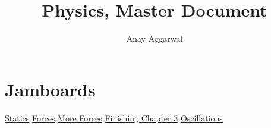 \documentclass[11pt]{scrartcl}
\title{Physics, Master Document}
\author{Anay Aggarwal}
\begin{document}
\maketitle
\section{Jamboards}
\href{https://jamboard.google.com/d/1uoYdMKXinEdf1\_fIV\_Um4zPiH8XeXSZzDs1etD-xgbI/viewer?f=0}{Statics} \newline
\href{https://jamboard.google.com/d/1ajkcgySLsFFmAIlD7kHRhOTfPmT233VM9uvkb6ygHFg/viewer?f=0}{Forces} \newline
\href{https://jamboard.google.com/d/19tQ1\_l9Pz5J62Dyj3KkGLjumSymWhyoXW8kS4kQQBSg/viewer?f=0}{More Forces} \newline
\href{https://jamboard.google.com/d/1MbDdIBIItbUHffvw165ii3ZKFlsYYW7sVqZbw3JTE5k/viewer?f=0}{Finishing Chapter 3}
\href{https://jamboard.google.com/d/1dbo9FVwQZNCMXaT9OfHmJFNlvY1AcgZkJbSVOeSiLaU/viewer?f=0}{Oscillations}
\newpage
\end{document}
